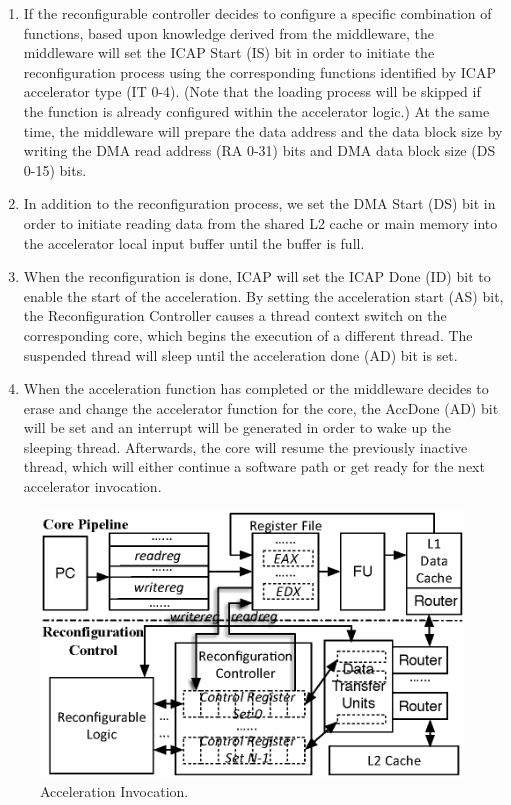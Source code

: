 \begin{enumerate}
\item If the reconfigurable controller decides to configure a specific
  combination of functions, based upon knowledge derived from the middleware, the
  middleware will set the ICAP Start (IS) bit in order to initiate the
  reconfiguration process using the corresponding functions identified by ICAP
  accelerator type (IT 0-4). (Note that the loading process will be skipped if
  the function is already configured within the accelerator logic.) At the
  same time, the middleware will prepare the data address and the data
  block size by writing the DMA read address (RA 0-31) bits and DMA
  data block size (DS 0-15) bits.

\item In addition to the reconfiguration process, we set the DMA Start
  (DS) bit in order to initiate reading data from the shared L2 cache or main
  memory into the accelerator local input buffer until the buffer is full.

\item When the reconfiguration is done, ICAP will set the ICAP Done
  (ID) bit to enable the start of the acceleration. By setting
  the acceleration start (AS) bit, the Reconfiguration Controller causes a
  thread context switch on the corresponding core, which begins the
  execution of a different thread. The suspended thread will sleep
  until the acceleration done (AD) bit is set.

\item When the acceleration function has completed or the middleware
  decides to erase and change the accelerator function for the core,
  the AccDone (AD) bit will be set and an interrupt will be generated in order to
  wake up the sleeping thread. Afterwards, the core will resume the previously
  inactive thread, which will either continue a software path or get
  ready for the next accelerator invocation.
\end{enumerate}


\begin{figure}
    \centering
    \includegraphics[width=4.0 in]{HPCA14-Acceleration_Invocation}
    \caption{Acceleration Invocation.}
    \label{fig_Acc_Invoc}
\end{figure}


